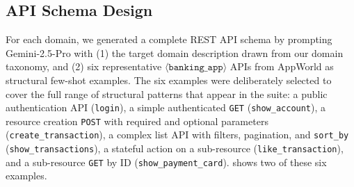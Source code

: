 
\subsection{API Schema Design}

For each domain, we generated a complete REST API schema by prompting Gemini-2.5-Pro with (1) the target domain description drawn from our domain taxonomy, and (2) six representative $\langle\mathtt{banking\_app}\rangle$ APIs from AppWorld as structural few-shot examples. The six examples were deliberately selected to cover the full range of structural patterns that appear in the suite: a public authentication API (\texttt{login}), a simple authenticated \texttt{GET} (\texttt{show\_account}), a resource creation \texttt{POST} with required and optional parameters (\texttt{create\_transaction}), a complex list API with filters, pagination, and \texttt{sort\_by} (\texttt{show\_transactions}), a stateful action on a sub-resource (\texttt{like\_transaction}), and a sub-resource \texttt{GET} by ID (\texttt{show\_payment\_card}).  shows two of these six examples.

